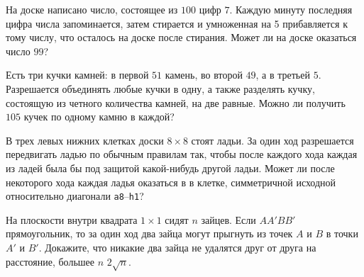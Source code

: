 \begin{problems}
\item
На доске написано число, состоящее из $100$ цифр $7$.
Каждую минуту последняя цифра числа запоминается, затем стирается и умноженная
на 5 прибавляется к тому числу, что осталось на доске после стирания.
Может ли на доске оказаться число $99$?

\item
Есть три кучки камней: в первой $51$ камень, во второй $49$, а в третьей $5$.
Разрешается объединять любые кучки в одну, а также разделять кучку, состоящую
из четного количества камней, на две равные.
Можно ли получить $105$ кучек по одному камню в каждой?

\item
В трех левых нижних клетках доски $8 \times 8$ стоят ладьи.
За один ход разрешается передвигать ладью по обычным правилам так, чтобы после
каждого хода каждая из ладей была бы под защитой какой-нибудь другой ладьи.
Может ли после некоторого хода каждая ладья оказаться в в клетке, симметричной
исходной относительно диагонали \texttt{a8}--\texttt{h1}?

\vspace{1ex}
\begin{center}
\end{center}
\vspace{1ex}


\item
На плоскости внутри квадрата $1 \times 1$ сидят $n$ зайцев.
Если $A A' B B'$ прямоугольник, то за один ход два зайца могут прыгнуть из
точек $A$ и $B$ в точки $A'$ и $B'$.
Докажите, что никакие два зайца не удалятся друг от друга на расстояние,
большее
\quad
\sbp $n$
\quad
\sbp $2 \sqrt{n}$.

\end{problems}

